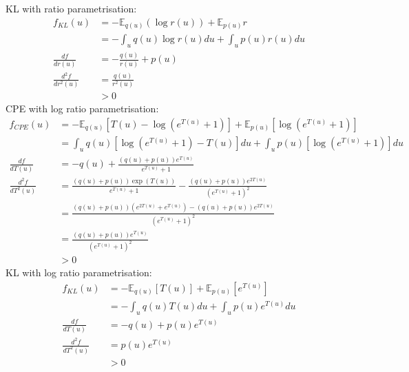 \documentclass[honours,12pt]{unswthesis}
\newcommand{\E}{\mathbb{E}}
\numberwithin{equation}{section}
\theoremstyle{definition}
\begin{document}
KL with ratio parametrisation:
\begin{align*}
f_{KL}(u)&=-\E_{q(u)}(\log r(u))+\E_{p(u)}r\\
&=-\int_u q(u)\log r(u) du+\int_u p(u)r(u)du\\
\frac{df}{dr(u)}&=-\frac{q(u)}{r(u)}+p(u)\\
\frac{d^2f}{dr^2(u)}&=\frac{q(u)}{r^2(u)}\\
&>0
\end{align*}
CPE with log ratio parametrisation:
\begin{align*}
f_{CPE}(u)&=-\E_{q(u)}[T(u)-\log(e^{T(u)}+1)]+\E_{p(u)}[\log(e^{T(u)}+1)]\\
&=\int_u q(u)[\log(e^{T(u)}+1)-T(u)] du+\int_u p(u)[\log(e^{T(u)}+1)]du\\
\frac{df}{dT(u)}&=-q(u)+\frac{(q(u)+p(u))e^{T(u)}}{e^{T(u)}+1}\\
\frac{d^2f}{dT^2(u)}&=\frac{(q(u)+p(u))\exp(T(u))}{e^{T(u)}+1}-\frac{(q(u)+p(u))e^{2T(u)}}{(e^{T(u)}+1)^2}\\
&=\frac{(q(u)+p(u))(e^{2T(u)}+e^{T(u)})-(q(u)+p(u))e^{2T(u)}}{(e^{T(u)}+1)^2}\\
&=\frac{(q(u)+p(u))e^{T(u)}}{(e^{T(u)}+1)^2}\\
&>0
\end{align*}
KL with log ratio parametrisation:
\begin{align*}
f_{KL}(u)&=-\E_{q(u)}[T(u)]+\E_{p(u)}[e^{T(u)}]\\
&=-\int_u q(u)T(u)du+\int_u p(u)e^{T(u)}du\\
\frac{df}{dT(u)}&=-q(u)+p(u)e^{T(u)}\\
\frac{d^2f}{dT^2(u)}&=p(u)e^{T(u)}\\
&>0
\end{align*}
\end{document}
